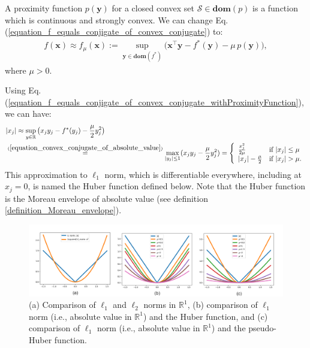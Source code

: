 \documentclass[lang=cn,10pt]{gorgeousnbook}
\numberwithin{equation}{section}%
\numberwithin{figure}{section}%
\begin{document}
% 
\begin{definition}
A proximity function $p(\boldsymbol{y})$ for a closed convex set $\mathcal{S} \in \textbf{dom}(p)$ is a function which is continuous and strongly convex.
We can change Eq. (\ref{equation_f_equals_conjigate_of_convex_conjugate}) to:
\begin{align}\label{equation_f_equals_conjigate_of_convex_conjugate_withProximityFunction}
f(\boldsymbol{x}) \approx f_{\mu}(\boldsymbol{x}) := \sup_{\boldsymbol{y} \in \textbf{dom}(f^*)} \big( \boldsymbol{x}^\top \boldsymbol{y} - f^*(\boldsymbol{y}) - \mu\, p(\boldsymbol{y}) \big),
\end{align}
where $\mu > 0$.
\end{definition}
Using Eq. (\ref{equation_f_equals_conjigate_of_convex_conjugate_withProximityFunction}), we can have:
\begin{align*}
&|x_j| \approx \sup_{y \in \mathbb{R}} \big( x_j y_j - f^*(y_j) - \frac{\mu}{2} y_j^2 \big) \\
&\overset{(\ref{equation_convex_conjugate_of_absolute_value})}{=} \max_{|y_j| \leq 1} (x_j y_j - \frac{\mu}{2} y_j^2) = 
\left\{
    \begin{array}{ll}
        \frac{x_j^2}{2 \mu} & \mbox{if } |x_j| \leq \mu \\
        |x_j| - \frac{\mu}{2} & \mbox{if } |x_j| > \mu.
    \end{array}
\right.
\end{align*}
This approximation to $\ell_1$ norm, which is differentiable everywhere, including at $x_j = 0$, is named the Huber function defined below. 
Note that the Huber function is the  Moreau envelope of absolute value (see definition \ref{definition_Moreau_envelope}).

\begin{figure}[!t]
\centering
\includegraphics[width=7in]{./images/Huber2}
\caption{(a) Comparison of $\ell_1$ and $\ell_2$ norms in $\mathbb{R}^1$, (b) comparison of $\ell_1$ norm (i.e., absolute value in $\mathbb{R}^1$) and the Huber function, and (c) comparison of $\ell_1$ norm (i.e., absolute value in $\mathbb{R}^1$) and the pseudo-Huber function.}
\label{figure_Huber}
\end{figure}
\end{document}
